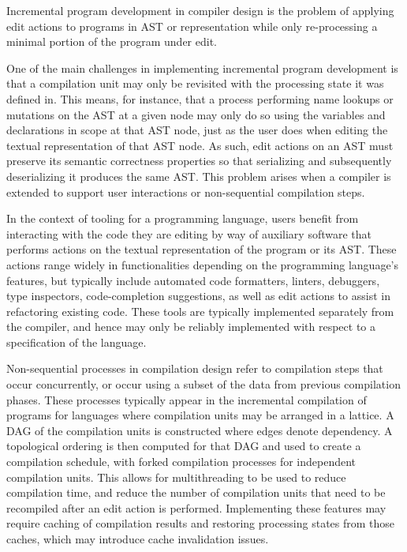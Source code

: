 Incremental program development in compiler design is the problem of applying edit actions to programs in \ac{AST} or representation while only re-processing a minimal portion of the program under edit.

One of the main challenges in implementing incremental program development is that a compilation unit may only be revisited with the processing state it was defined in.
This means, for instance, that a process performing name lookups or mutations on the \ac{AST} at a given node may only do so using the variables and declarations in scope at that \ac{AST} node, just as the user does when editing the textual representation of that \ac{AST} node.
As such, edit actions on an \ac{AST} must preserve its semantic correctness properties so that serializing and subsequently deserializing it produces the same \ac{AST}.
This problem arises when a compiler is extended to support user interactions or non-sequential compilation steps.

In the context of tooling for a programming language, users benefit from interacting with the code they are editing by way of auxiliary software that performs actions on the textual representation of the program or its \ac{AST}.
These actions range widely in functionalities depending on the programming language's features, but typically include automated code formatters, linters, debuggers, type inspectors, code-completion suggestions, as well as edit actions to assist in refactoring existing code.
These tools are typically implemented separately from the compiler, and hence may only be reliably implemented with respect to a specification of the language.


Non-sequential processes in compilation design refer to compilation steps that occur concurrently, or occur using a subset of the data from previous compilation phases.
These processes typically appear in the incremental compilation of programs for languages where compilation units may be arranged in a lattice.
A \ac{DAG} of the compilation units is constructed where edges denote dependency.
A topological ordering is then computed for that \ac{DAG} and used to create a compilation schedule, with forked compilation processes for independent compilation units.
This allows for multithreading to be used to reduce compilation time, and reduce the number of compilation units that need to be recompiled after an edit action is performed.
Implementing these features may require caching of compilation results and restoring processing states from those caches, which may introduce cache invalidation issues.

